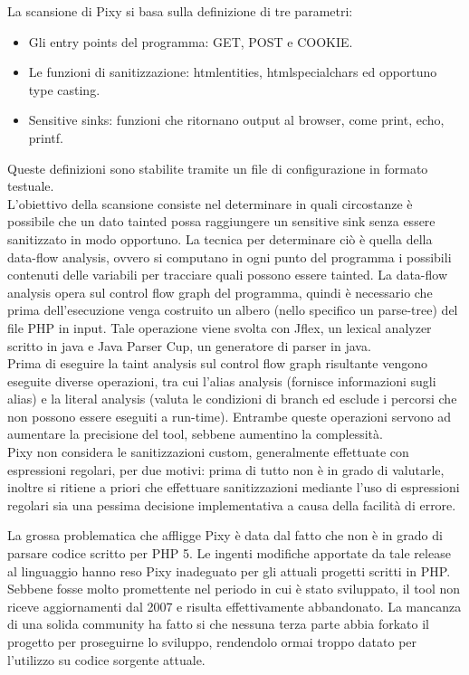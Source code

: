 La scansione di Pixy si basa sulla definizione di tre parametri:
\begin{itemize}
\item Gli entry points del programma: GET, POST e COOKIE.
\item Le funzioni di sanitizzazione: htmlentities, htmlspecialchars ed opportuno type casting.
\item Sensitive sinks: funzioni che ritornano output al browser, come print, echo, printf.
\end{itemize}
Queste definizioni sono stabilite tramite un file di configurazione in formato testuale.\\
L'obiettivo della scansione consiste nel determinare in quali circostanze è possibile che un dato tainted possa raggiungere un sensitive sink senza essere sanitizzato in modo opportuno. La tecnica per determinare ciò è quella della data-flow analysis, ovvero si computano in ogni punto del programma i possibili contenuti delle variabili per tracciare quali possono essere tainted. La data-flow analysis opera sul control flow graph del programma, quindi è necessario che prima dell'esecuzione venga costruito un albero (nello specifico un parse-tree) del file PHP in input. Tale operazione viene svolta con Jflex, un lexical analyzer scritto in java e Java Parser Cup, un generatore di parser in java.\\
Prima di eseguire la taint analysis sul control flow graph risultante vengono eseguite diverse operazioni, tra cui l'alias analysis (fornisce informazioni sugli alias) e la literal analysis (valuta le condizioni di branch ed esclude i percorsi che non possono essere eseguiti a run-time). Entrambe queste operazioni servono ad aumentare la precisione del tool, sebbene aumentino la complessità.\\
Pixy non considera le sanitizzazioni custom, generalmente effettuate con espressioni regolari, per due motivi: prima di tutto non è in grado di valutarle, inoltre si ritiene a priori che effettuare sanitizzazioni mediante l'uso di espressioni regolari sia una pessima decisione implementativa a causa della facilità di errore.

La grossa problematica che affligge Pixy è data dal fatto che non è in grado di parsare codice scritto per PHP 5. Le ingenti modifiche apportate da tale release al linguaggio hanno reso Pixy inadeguato per gli attuali progetti scritti in PHP.\\
Sebbene fosse molto promettente nel periodo in cui è stato sviluppato, il tool non riceve aggiornamenti dal 2007 e risulta effettivamente abbandonato. La mancanza di una solida community ha fatto si che nessuna terza parte abbia forkato il progetto per proseguirne lo sviluppo, rendendolo ormai troppo datato per l'utilizzo su codice sorgente attuale.

